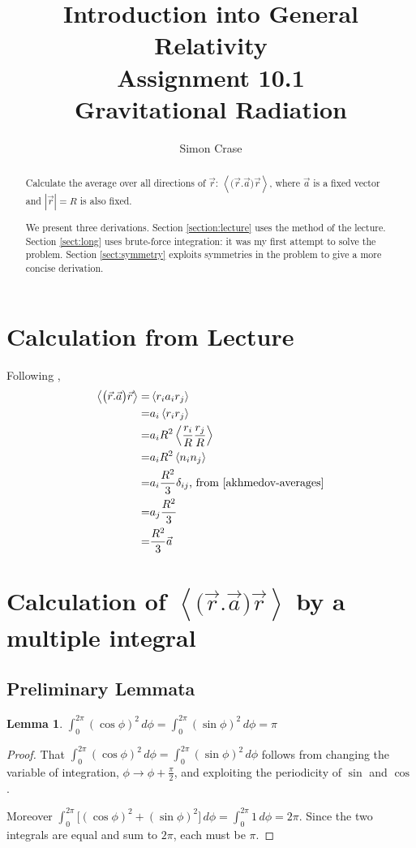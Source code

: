 \documentclass[]{article}
\title{Introduction into General Relativity\\Assignment 10.1\\Gravitational Radiation}
\author{Simon Crase}
\newtheorem{lemma}{Lemma}
\begin{document}
\maketitle

\begin{abstract}
	
	Calculate the average over all directions of $\vec{r}$: $\left\langle \big(\vec{r}.\vec{a}\big)\vec{r} \right\rangle$, where $\vec{a}$ is a fixed vector and $|\vec{r}|=R$ is also fixed.
	
	We present three derivations. Section \ref{section:lecture} uses the method of the lecture. Section \ref{sect:long} uses brute-force integration: it was my first attempt to solve the problem. Section \ref{sect:symmetry} exploits symmetries in the problem to give a more concise derivation.
\end{abstract}

\tableofcontents

\section{Calculation from Lecture}\label{section:lecture}
Following \cite{akhmedov-averages},
\begin{align*}
\left\langle \big(\vec{r}.\vec{a}\big)\vec{r} \right\rangle =& \left\langle r_i a_i r_j \right\rangle\\
=&a_i\left\langle r_i r_j\right\rangle\\
=&a_i R^2 \left\langle \frac{r_i}{R} \frac{r_j}{R}\right\rangle\\
=&a_i R^2 \left\langle n_i n_j\right\rangle\\
=&a_i \frac{R^2}{3} \delta_{ij} \text{, from \cite{akhmedov-averages}}\\
=&a_j \frac{R^2}{3}\\
=& \frac{R^2}{3} \vec{a}
\end{align*}

\section{Calculation of $\left\langle \big(\vec{r}.\vec{a}\big)\vec{r} \right\rangle$ by a multiple integral}\label{sect:long}
\subsection{Preliminary Lemmata}
\begin{lemma}\label{lemma:i1}
	$\int_{0}^{2\pi}(\cos\phi)^2 \, d\phi = \int_{0}^{2\pi}(\sin\phi)^2 \, d\phi=\pi$
\end{lemma}
\begin{proof}
	That $\int_{0}^{2\pi}(\cos\phi)^2 \, d\phi = \int_{0}^{2\pi}(\sin\phi)^2 \, d\phi$ follows from changing the variable of integration, $\phi\rightarrow\phi+\frac{\pi}{2}$, and exploiting the periodicity of $\sin$ and $\cos$. 
	
	Moreover $\int_{0}^{2\pi}\big[(\cos\phi)^2  +(\sin\phi)^2\big] \, d\phi=\int_{0}^{2\pi}1 \, d\phi=2\pi$. Since the two integrals are equal and sum to $2\pi$, each must be $\pi$.
\end{proof}
\end{document}
